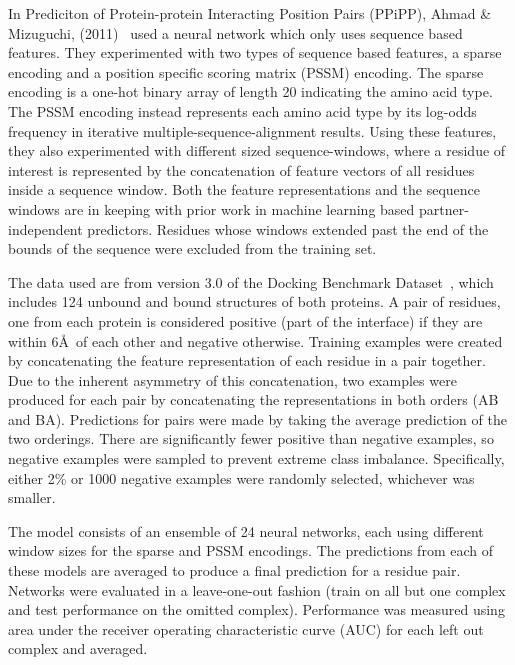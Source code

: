 In Prediciton of Protein-protein Interacting Position Pairs (PPiPP), Ahmad \& Mizuguchi, (2011)~\cite{ahmad2011} used a neural network which only uses sequence based features.
They experimented with two types of sequence based features, a sparse encoding and a position specific scoring matrix (PSSM) encoding.
The sparse encoding is a one-hot binary array of length 20 indicating the amino acid type.
The PSSM encoding instead represents each amino acid type by its log-odds frequency in iterative multiple-sequence-alignment results.
Using these features, they also experimented with different sized sequence-windows, where a residue of interest is represented by the concatenation of feature vectors of all residues inside a sequence window.
Both the feature representations and the sequence windows are in keeping with prior work in machine learning based partner-independent predictors.
Residues whose windows extended past the end of the bounds of the sequence were excluded from the training set.

The data used are from version 3.0 of the Docking Benchmark Dataset~\cite{hwang2008}, which includes 124 unbound and bound structures of both proteins.
A pair of residues, one from each protein is considered positive (part of the interface) if they are within 6\AA~of each other and negative otherwise.
Training examples were created by concatenating the feature representation of each residue in a pair together.
Due to the inherent asymmetry of this concatenation, two examples were produced for each pair by concatenating the representations in both orders (AB and BA).
Predictions for pairs were made by taking the average prediction of the two orderings.
There are significantly fewer positive than negative examples, so negative examples were sampled to prevent extreme class imbalance.
Specifically, either 2\% or 1000 negative examples were randomly selected, whichever was smaller.

The model consists of an ensemble of 24 neural networks, each using different window sizes for the sparse and PSSM encodings.
The predictions from each of these models are averaged to produce a final prediction for a residue pair.
Networks were evaluated in a leave-one-out fashion (train on all but one complex and test performance on the omitted complex).
Performance was measured using area under the receiver operating characteristic curve (AUC) for each left out complex and averaged.

